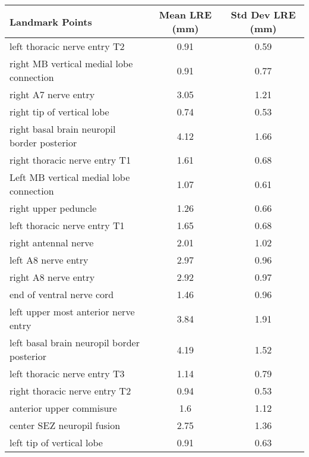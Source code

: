 \begin{tabular}{lcc}
\hline
 ﻿Landmark Points                            & Mean LRE (mm) & Std Dev LRE (mm) \\ \hline \hline
 left thoracic nerve entry T2                & 0.91          & 0.59             \\
 right MB vertical medial lobe connection    & 0.91          & 0.77             \\
 right A7 nerve entry                        & 3.05          & 1.21             \\
 right tip of vertical lobe                  & 0.74          & 0.53             \\
 right basal brain neuropil border posterior & 4.12          & 1.66             \\
 right thoracic nerve entry T1               & 1.61          & 0.68             \\
 Left MB vertical medial lobe connection     & 1.07          & 0.61             \\
 right upper peduncle                        & 1.26          & 0.66             \\
 left thoracic nerve entry T1                & 1.65          & 0.68             \\
 right antennal nerve                        & 2.01          & 1.02             \\
 left A8 nerve entry                         & 2.97          & 0.96             \\
 right A8 nerve entry                        & 2.92          & 0.97             \\
 end of ventral nerve cord                   & 1.46          & 0.96             \\
 left upper most anterior nerve entry        & 3.84          & 1.91             \\
 left basal brain neuropil border posterior  & 4.19          & 1.52             \\
 left thoracic nerve entry T3                & 1.14          & 0.79             \\
 right thoracic nerve entry T2               & 0.94          & 0.53             \\
 anterior upper commisure                    & 1.6           & 1.12             \\
 center SEZ neuropil fusion                  & 2.75          & 1.36             \\
 left tip of vertical lobe                   & 0.91          & 0.63             \\

\end{tabular}
